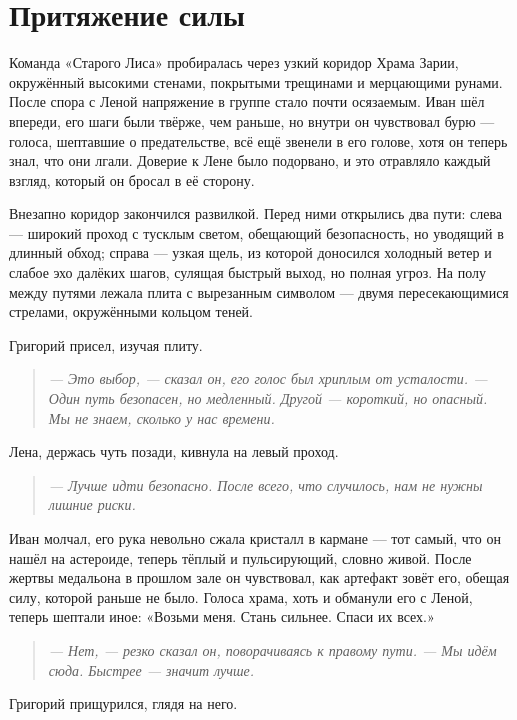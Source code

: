 \documentclass[12pt,a4paper]{book}
\newenvironment{dialogue}{\begin{quote}\itshape}{\end{quote}} %
\begin{document}
\chapter{Притяжение силы}

Команда «Старого Лиса» пробиралась через узкий коридор Храма Зарии, окружённый высокими стенами, покрытыми трещинами и мерцающими рунами. После спора с Леной напряжение в группе стало почти осязаемым. Иван шёл впереди, его шаги были твёрже, чем раньше, но внутри он чувствовал бурю --- голоса, шептавшие о предательстве, всё ещё звенели в его голове, хотя он теперь знал, что они лгали. Доверие к Лене было подорвано, и это отравляло каждый взгляд, который он бросал в её сторону.

Внезапно коридор закончился развилкой. Перед ними открылись два пути: слева --- широкий проход с тусклым светом, обещающий безопасность, но уводящий в длинный обход; справа --- узкая щель, из которой доносился холодный ветер и слабое эхо далёких шагов, сулящая быстрый выход, но полная угроз. На полу между путями лежала плита с вырезанным символом --- двумя пересекающимися стрелами, окружёнными кольцом теней.

Григорий присел, изучая плиту.

\begin{dialogue}
--- Это выбор, --- сказал он, его голос был хриплым от усталости. --- Один путь безопасен, но медленный. Другой --- короткий, но опасный. Мы не знаем, сколько у нас времени.
\end{dialogue}

Лена, держась чуть позади, кивнула на левый проход.

\begin{dialogue}
--- Лучше идти безопасно. После всего, что случилось, нам не нужны лишние риски.
\end{dialogue}

Иван молчал, его рука невольно сжала кристалл в кармане --- тот самый, что он нашёл на астероиде, теперь тёплый и пульсирующий, словно живой. После жертвы медальона в прошлом зале он чувствовал, как артефакт зовёт его, обещая силу, которой раньше не было. Голоса храма, хоть и обманули его с Леной, теперь шептали иное: «Возьми меня. Стань сильнее. Спаси их всех.»

\begin{dialogue}
--- Нет, --- резко сказал он, поворачиваясь к правому пути. --- Мы идём сюда. Быстрее --- значит лучше.
\end{dialogue}

Григорий прищурился, глядя на него.
\end{document}
